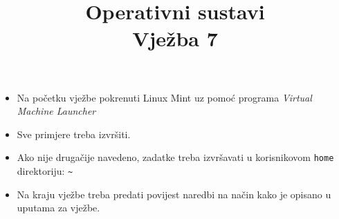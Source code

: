 \documentclass[a4paper,12pt]{article}
\title
{Operativni sustavi\\
Vježba 7}
\date{}
\begin{document}
\maketitle
{}

\begin{itemize}
\item Na početku vježbe pokrenuti Linux Mint uz pomoć programa \textit{Virtual Machine Launcher}
\item Sve primjere treba izvršiti.
\item Ako nije drugačije navedeno, zadatke treba izvršavati u korisnikovom \texttt{home} direktoriju: \lstinline!~!
\item Na kraju vježbe treba predati povijest naredbi na način kako je opisano u uputama za vježbe.

\end{itemize}

\end{document}

